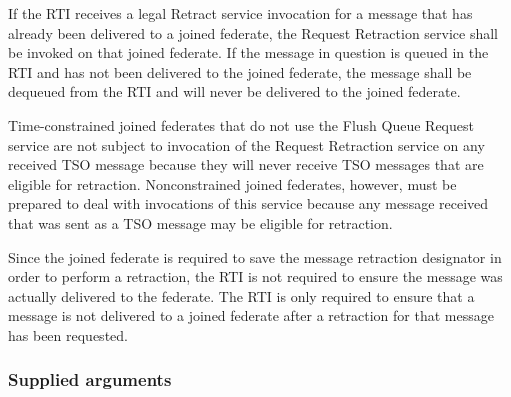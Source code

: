 \begin{compactstdpage}
    If the RTI receives a legal Retract service invocation for a message that has already been delivered to a joined federate, the Request Retraction \rtiinitiated{} service shall be invoked on that joined federate. If the message in question is queued in the RTI and has not been delivered to the joined federate, the message shall be dequeued from the RTI and will never be delivered to the joined federate.

    Time-constrained joined federates that do not use the Flush Queue Request service are not subject to invocation of the Request Retraction \rtiinitiated{} service on any received TSO message because they will never receive TSO messages that are eligible for retraction. Nonconstrained joined federates, however, must be prepared to deal with invocations of this service because any message received that was sent as a TSO message may be eligible for retraction.

    Since the joined federate is required to save the message retraction designator in order to perform a retraction, the RTI is not required to ensure the message was actually delivered to the federate. The RTI is only required to ensure that a message is not delivered to a joined federate after a retraction for that message has been requested.

    \subsubsection{Supplied arguments}



\end{compactstdpage}

\clearpage

